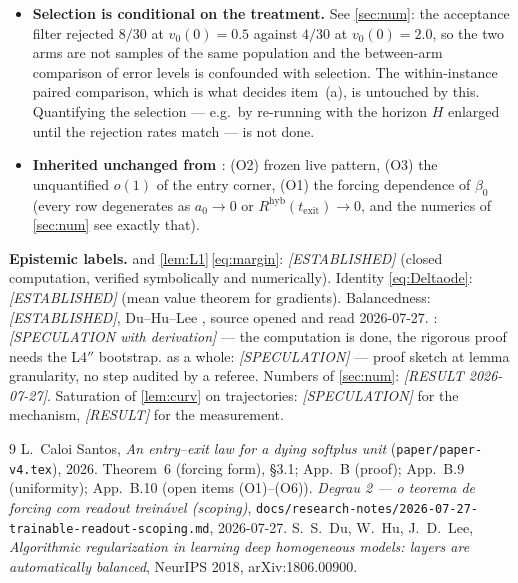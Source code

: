 \documentclass[11pt]{article}
\theoremstyle{remark}
\newcommand{\texit}{t_{\mathrm{exit}}}
\newcommand{\hyb}{\mathrm{hyb}}
\begin{document}
\begin{itemize}
\item[(P9)] \textbf{Selection is conditional on the treatment.} See
\cref{sec:num}: the acceptance filter rejected $8/30$ at $v_0(0)=0.5$ against
$4/30$ at $v_0(0)=2.0$, so the two arms are not samples of the same population
and the between-arm comparison of error levels is confounded with selection.
The within-instance paired comparison, which is what decides item~(a), is
untouched by this. Quantifying the selection --- e.g.\ by re-running with the
horizon $H$ enlarged until the rejection rates match --- is not done.
\item[(P6)] \textbf{Inherited unchanged from \cite{paper}}: (O2) frozen live
pattern, (O3) the unquantified $o(1)$ of the entry corner, (O1) the forcing
dependence of $\beta_0$ (every row degenerates as $a_0\to0$ or
$R^{\hyb}(\texit)\to0$, and the numerics of \cref{sec:num} see exactly that).
\end{itemize}

\bigskip
\noindent\textbf{Epistemic labels.}
 and \cref{lem:L1}\,\eqref{eq:margin}: \emph{[ESTABLISHED]}
(closed computation, verified symbolically and numerically).
Identity \eqref{eq:Deltaode}: \emph{[ESTABLISHED]} (mean value theorem for
gradients).
Balancedness: \emph{[ESTABLISHED]}, Du--Hu--Lee \cite{duhulee}, source opened
and read 2026-07-27.
: \emph{[SPECULATION with derivation]} --- the computation is
done, the rigorous proof needs the L4$''$ bootstrap.
 as a whole: \emph{[SPECULATION]} --- proof sketch at lemma
granularity, no step audited by a referee.
Numbers of \cref{sec:num}: \emph{[RESULT 2026-07-27]}.
Saturation of \cref{lem:curv} on trajectories: \emph{[SPECULATION]} for the
mechanism, \emph{[RESULT]} for the measurement.

\begin{thebibliography}{9}
 L.~Caloi Santos, \emph{An entry--exit law for a dying softplus
unit} (\texttt{paper/paper-v4.tex}), 2026. Theorem~6 (forcing form),
\S3.1; App.~B (proof); App.~B.9 (uniformity); App.~B.10 (open items (O1)--(O6)).
 \emph{Degrau 2 --- o teorema de forcing com readout
trein\'avel (scoping)}, \texttt{docs/research-notes/2026-07-27-trainable-readout-scoping.md}, 2026-07-27.
 S.~S.~Du, W.~Hu, J.~D.~Lee, \emph{Algorithmic regularization
in learning deep homogeneous models: layers are automatically balanced},
NeurIPS 2018, arXiv:1806.00900.
\end{thebibliography}
\end{document}
